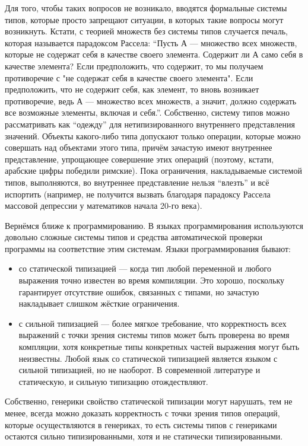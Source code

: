 \documentclass[a5paper]{article}
\begin{document}
Для того, чтобы таких вопросов не возникало, вводятся формальные системы типов, которые просто запрещают ситуации, в которых такие вопросы могут возникнуть. Кстати, с теорией множеств без системы типов случается печаль, которая называется парадоксом Рассела: ``Пусть А --- множество всех множеств, которые не содержат себя в качестве своего элемента. Содержит ли А само себя в качестве элемента? Если предположить, что содержит, то мы получаем противоречие с "не содержат себя в качестве своего элемента". Если предположить, что  не содержит себя, как элемент, то вновь возникает противоречие, ведь А — множество всех множеств, а значит, должно содержать все возможные элементы, включая и себя.''. Собственно, систему типов можно рассматривать как ``одежду'' для нетипизированного внутреннего представления значений. Объекты какого-либо типа допускают только операции, которые можно совершать над объектами этого типа, причём зачастую имеют внутреннее представление, упрощающее совершение этих операций (поэтому, кстати, арабские цифры победили римские). Пока ограничения, накладываемые системой типов, выполняются, во внутреннее представление нельзя ``влезть'' и всё испортить (например, не получится вызвать благодаря парадоксу Рассела массовой депрессии у математиков начала 20-го века).

Вернёмся ближе к программированию. В языках программирования используются довольно сложные системы типов и средства автоматической проверки программы на соответствие этим системам. Языки программирования бывают:

\begin{itemize}
    \item со статической типизацией --- когда тип любой переменной и любого выражения точно известен во время компиляции. Это хорошо, поскольку гарантирует отсутствие ошибок, связанных с типами, но зачастую накладывает слишком жёсткие ограничения.
    \item с сильной типизацией --- более мягкое требование, что корректность всех выражений с точки зрения системы типов может быть проверена во время компляции, хотя конкретные типы конкретных частей выражения могут быть неизвестны. Любой язык со статической типизацией является языком с сильной типизацией, но не наоборот. В современной литературе и статическую, и сильную типизацию отождествляют.
\end{itemize}

Собственно, генерики свойство статической типизации могут нарушать, тем не менее, всегда можно доказать корректность с точки зрения типов операций, которые осуществляются в генериках, то есть системы типов с генериками остаются сильно типизированными, хотя и не статически типизированными.
\end{document}
